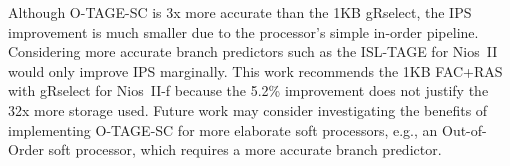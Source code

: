 Although \mbox{O-TAGE-SC} is \mytilde 3x more accurate than the 1KB gRselect, the IPS improvement is much smaller due to the processor's simple in-order pipeline. Considering more accurate branch predictors such as the ISL-TAGE for Nios~II would only improve IPS marginally. This work recommends the 1KB FAC+RAS with gRselect for Nios~II-f because the 5.2\% improvement does not justify the 32x more storage used. Future work may consider investigating the benefits of implementing \mbox{O-TAGE-SC} for more elaborate soft processors, e.g., an Out-of-Order soft processor, which requires a more accurate branch predictor.
